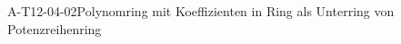 
\begin{DEF}{A-T12-04-02}{Polynomring mit Koeffizienten in Ring als Unterring von Potenzreihenring}
\end{DEF}
